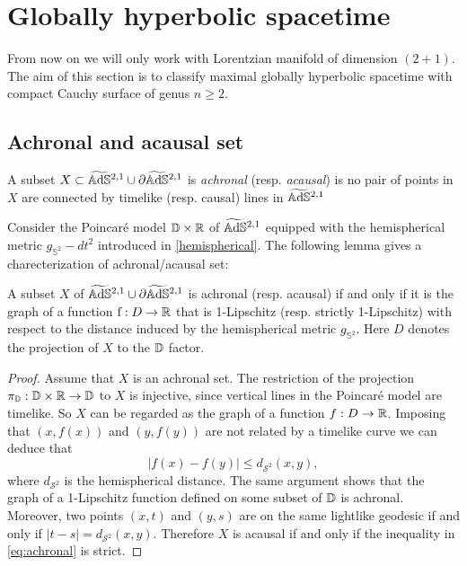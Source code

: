 \chapter{Globally hyperbolic spacetime}\label{chapter:4}

From now on we will only work with Lorentzian manifold of dimension $(2+1)$.\\
The aim of this section is to classify maximal globally hyperbolic spacetime with compact Cauchy surface of genus $n\geq 2$.

\section{Achronal and acausal set}

\begin{definition}
    A subset $X \subset \widetilde{\mathbb{A}\mathrm{d}\mathbb{S}}{}^{2,1} \cup \partial\widetilde{\mathbb{A}\mathrm{d}\mathbb{S}}{}^{2,1}$ is \textit{achronal} (resp. \textit{acausal}) is no pair of points in $X$ are connected by timelike (resp. causal) lines in $\widetilde{\mathbb{A}\mathrm{d}\mathbb{S}}{}^{2,1}$
\end{definition}
Consider the Poincaré model $\mathbb{D}\times\mathbb{R}$ of $\widetilde{\mathbb{A}\mathrm{d}\mathbb{S}}{}^{2,1}$ equipped with the hemispherical metric $g_{\mathbb{S}^2} - dt^2$ introduced in \ref{hemispherical}. The following lemma gives a charecterization of achronal/acausal set:
\begin{lemma}
    A subset $X$ of $\widetilde{\mathbb{A}\mathrm{d}\mathbb{S}}{}^{2,1} \cup \partial\widetilde{\mathbb{A}\mathrm{d}\mathbb{S}}{}^{2,1}$ is achronal (resp. acausal) if and only if it is the graph of a function $\text{f} : D \to \mathbb{R}$ that is 1-Lipschitz (resp. strictly 1-Lipschitz) with respect to the distance induced by the hemispherical metric $g_{\mathbb{S}^2}$. Here $D$ denotes the projection of $X$ to the $\mathbb{D}$ factor.
\end{lemma} 
\begin{proof}
    Assume that $X$ is an achronal set. The restriction of the projection $\pi_{\mathbb{D}} : \mathbb{D} \times \mathbb{R} \to \mathbb{D}$ to $X$ is injective, since vertical lines in the Poincaré model are timelike. So $X$ can be regarded as the graph of a function $f : D \to\mathbb{R}$. Imposing that $(x,f(x))$ and $(y,f(y))$ are not related by a timelike curve we can deduce that
    \begin{equation} \label{eq:achronal}
        |f(x) - f(y)| \leq d_{\mathcal{S}^2}(x,y),
    \end{equation}
    where $d_{\mathcal{S}^2}$ is the hemispherical distance. The same argument shows that the graph of a 1-Lipschitz function defined on some subset of $\mathbb{D}$ is achronal.\\
    Moreover, two points $(x,t)$ and $(y,s)$ are on the same lightlike geodesic if and only if $|t-s| =  d_{\mathcal{S}^2}(x,y)$. Therefore $X$ is acausal if and only if the inequality in \ref{eq:achronal} is strict.
\end{proof}
